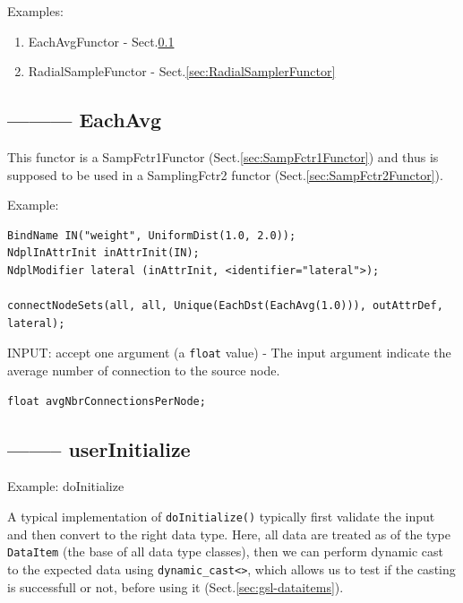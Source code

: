 Examples:
\begin{enumerate}
  \item EachAvgFunctor - Sect.\ref{sec:EachAvgFunctor}

  \item RadialSampleFunctor - Sect.\ref{sec:RadialSamplerFunctor}
\end{enumerate}





\subsection{--------- EachAvg}
\label{sec:EachAvgFunctor}
\label{sec:functor-doInitialize()}

This functor is a SampFctr1Functor (Sect.\ref{sec:SampFctr1Functor}) and thus is
supposed to be used in a SamplingFctr2 functor (Sect.\ref{sec:SampFctr2Functor}).

Example: 
\begin{verbatim}
BindName IN("weight", UniformDist(1.0, 2.0));
NdplInAttrInit inAttrInit(IN);
NdplModifier lateral (inAttrInit, <identifier="lateral">);

connectNodeSets(all, all, Unique(EachDst(EachAvg(1.0))), outAttrDef, lateral);
\end{verbatim}

INPUT: accept one argument (a \verb!float! value) -  The input argument indicate
the average number of connection to the source node.
\begin{verbatim}
float avgNbrConnectionsPerNode;
\end{verbatim}

\subsection{-------- userInitialize}

Example: doInitialize

A typical implementation of \verb!doInitialize()! typically first validate the
input and then convert to the right data type. Here, all data are treated as of
the type \verb!DataItem! (the base of all data type classes), then we can
perform dynamic cast to the expected data using \verb!dynamic_cast<>!, which
allows us to test if the casting is successfull or not, before using it
(Sect.\ref{sec:gsl-dataitems}).

